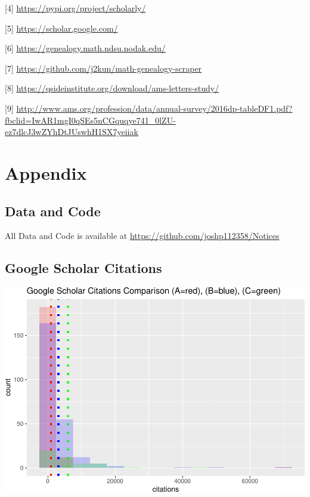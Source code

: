 \documentclass[]{article}
\begin{document}
{[}4{]} \url{https://pypi.org/project/scholarly/}

{[}5{]} \url{https://scholar.google.com/}

{[}6{]} \url{https://genealogy.math.ndsu.nodak.edu/}

{[}7{]} \url{https://github.com/j2kun/math-genealogy-scraper}

{[}8{]} \url{https://qsideinstitute.org/download/ams-letters-study/}

{[}9{]}
\url{http://www.ams.org/profession/data/annual-survey/2016dp-tableDF1.pdf?fbclid=IwAR1mgI0qSEs5nCGquqye741_0lZU-ez7dlcJ3wZYhDtJUswhH1SX7yeiiak}

\hypertarget{appendix}{%
\section{Appendix}\label{appendix}}

\hypertarget{data-and-code}{%
\subsection{Data and Code}\label{data-and-code}}

All Data and Code is available at
\url{https://github.com/joshp112358/Notices}

\hypertarget{google-scholar-citations}{%
\subsection{Google Scholar Citations}\label{google-scholar-citations}}

\includegraphics{final_files/figure-latex/unnamed-chunk-56-1.pdf}
\end{document}
